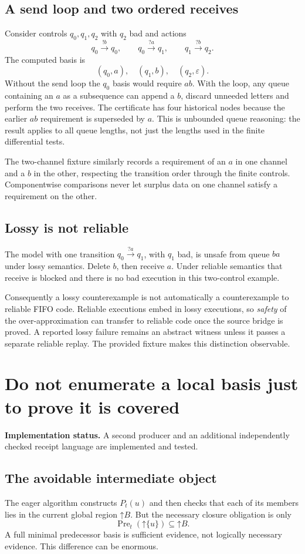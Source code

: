 \documentclass[11pt,a4paper]{article}
\theoremstyle{definition}
\newcommand{\Up}[1]{\mathord{\uparrow}#1}
\newcommand{\Pre}{\operatorname{Pre}}
\newcommand{\eps}{\varepsilon}
\newcommand{\status}[1]{\noindent\textbf{Implementation status.} #1\par}
\begin{document}
\subsection{A send loop and two ordered receives}
Consider controls $q_0,q_1,q_2$ with $q_2$ bad and actions
\[
 q_0\xrightarrow{!b}q_0,\qquad
 q_0\xrightarrow{?a}q_1,\qquad
 q_1\xrightarrow{?b}q_2.
\]
The computed basis is
\[
 (q_0,a),\quad(q_1,b),\quad(q_2,\eps).
\]
Without the send loop the $q_0$ basis would require $ab$. With the loop,
any queue containing an $a$ as a subsequence can append a $b$, discard
unneeded letters and perform the two receives. The certificate has four
historical nodes because the earlier $ab$ requirement is superseded by $a$.
This is unbounded queue reasoning: the result applies to all queue lengths,
not just the lengths used in the finite differential tests.

The two-channel fixture similarly records a requirement of an $a$ in one
channel and a $b$ in the other, respecting the transition order through the
finite controls. Componentwise comparisons never let surplus data on one
channel satisfy a requirement on the other.

\subsection{Lossy is not reliable}
The model with one transition $q_0\xrightarrow{?a}q_1$, with $q_1$ bad,
is unsafe from queue $ba$ under lossy semantics. Delete $b$, then receive
$a$. Under reliable semantics that receive is blocked and there is no bad
execution in this two-control example.

Consequently a lossy counterexample is not automatically a counterexample
to reliable FIFO code. Reliable executions embed in lossy executions, so
\emph{safety} of the over-approximation can transfer to reliable code once
the source bridge is proved. A reported lossy failure remains an abstract
witness unless it passes a separate reliable replay. The provided
 fixture makes this distinction observable.

\section{Do not enumerate a local basis just to prove it is covered}
\label{sec:separation}
\status{A second producer and an additional independently checked receipt language are implemented and tested.}

\subsection{The avoidable intermediate object}
The eager algorithm constructs $P_t(u)$ and then checks that each of its
members lies in the current global region $\Up B$. But the necessary closure
obligation is only
\begin{equation}
 \Pre_t(\Up{\{u\}})\subseteq\Up B.
 \label{eq:directclosure}
\end{equation}
A full minimal predecessor basis is sufficient evidence, not logically
necessary evidence. This difference can be enormous.
\end{document}
